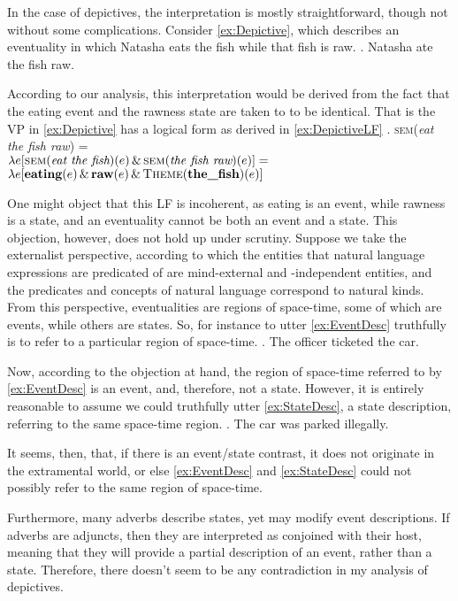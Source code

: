 \documentclass[MilwayThesis]{subfiles}
\begin{document}
In the case of depictives, the interpretation is mostly straightforward, though not without some complications.
Consider \cref{ex:Depictive}, which describes an eventuality in which Natasha eats the fish while that fish is raw.
\ex. Natasha ate the fish raw.\label{ex:Depictive}

According to our analysis, this interpretation would be derived from the fact that the eating event and the rawness state are taken to to be identical.
That is the VP in \cref{ex:Depictive} has a logical form  as derived in \cref{ex:DepictiveLF}
\ex. \textsc{sem}(\textit{eat the fish raw}) =\\
$\lambda e [\textsc{sem}(\textit{eat the fish})(e) \, \&\, \textsc{sem}(\textit{the fish raw})(e)] =$\\
$\lambda e [\textbf{eating}(e)\, \&\, \textbf{raw}(e)\, \&\, \textsc{Theme}(\textbf{the\_fish})(e)]$\label{ex:DepictiveLF}

One might object that this LF is incoherent, as eating is an event, while rawness is a state, and an eventuality cannot be both an event and a state.
This objection, however, does not hold up under scrutiny.
Suppose we take the externalist perspective, according to which the entities that natural language expressions are predicated of are mind-external and -independent entities, and the predicates and concepts of natural language correspond to natural kinds.
From this perspective, eventualities are regions of space-time, some of which are events, while others are states.
So, for instance to utter \cref{ex:EventDesc} truthfully is to refer to a particular region of space-time.
\ex.\label{ex:EventDesc} The officer ticketed the car.

Now, according to the objection at hand, the region of space-time referred to by \cref{ex:EventDesc} is an event, and, therefore, not a state.
However, it is entirely reasonable to assume we could truthfully utter \cref{ex:StateDesc}, a state description, referring to the same space-time region.
\ex.\label{ex:StateDesc} The car was parked illegally.

It seems, then, that, if there is an event/state contrast, it does not originate in the extramental world, or else \cref{ex:EventDesc} and \cref{ex:StateDesc} could not possibly refer to the same region of space-time.

Furthermore, many adverbs describe states, yet may modify event descriptions.
If adverbs are adjuncts, then they are interpreted as conjoined with their host, meaning that they will provide a partial description of an event, rather than a state.
Therefore, there doesn't seem to be any contradiction in my analysis of depictives.
\end{document}
